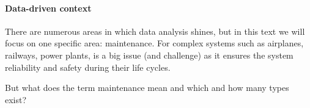 \paragraph{Data-driven context}
There are numerous areas in which data analysis shines, but in this text we will focus on one specific area: maintenance.
For complex systems such as airplanes, railways, power plants, is a big issue (and challenge) as it ensures the system reliability and safety during their life cycles.

But what does the term maintenance mean and which and how many types exist?